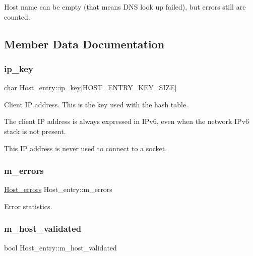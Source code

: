 Host name can be empty (that means D\+NS look up failed), but errors still are counted. 

\subsection{Member Data Documentation}
\mbox{\label{classHost__entry_aabff53a5d06c755d5407c1c26491e03c}} 
\subsubsection{\texorpdfstring{ip\+\_\+key}{ip\_key}}
{\footnotesize\ttfamily char Host\+\_\+entry\+::ip\+\_\+key\mbox{[}H\+O\+S\+T\+\_\+\+E\+N\+T\+R\+Y\+\_\+\+K\+E\+Y\+\_\+\+S\+I\+ZE\mbox{]}}

Client IP address. This is the key used with the hash table.

The client IP address is always expressed in I\+Pv6, even when the network I\+Pv6 stack is not present.

This IP address is never used to connect to a socket. \mbox{\label{classHost__entry_a51ff36508f22615dc5a6d1884beec68e}} 
\subsubsection{\texorpdfstring{m\+\_\+errors}{m\_errors}}
{\footnotesize\ttfamily \mbox{\hyperlink{structHost__errors}{Host\+\_\+errors}} Host\+\_\+entry\+::m\+\_\+errors}

Error statistics. \mbox{\label{classHost__entry_a1f04a6fdbcfb6676e8f4af5247ea74a7}} 
\subsubsection{\texorpdfstring{m\+\_\+host\+\_\+validated}{m\_host\_validated}}
{\footnotesize\ttfamily bool Host\+\_\+entry\+::m\+\_\+host\+\_\+validated}

